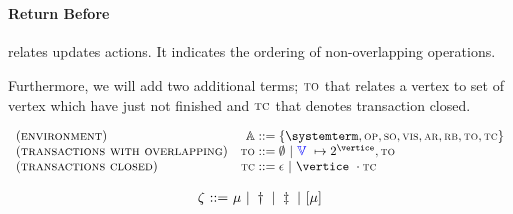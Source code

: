\[\begin{array}{l}
%
%
% 
%

 

 \end{array}
 \]
 


\paragraph{Return Before} relates updates actions. It indicates the ordering of non-overlapping operations. 

Furthermore, we will add two additional terms; $\textsc{\scriptsize{TO}}$ that relates a vertex to set of vertex which have just not finished and $\textsc{\scriptsize{TC}}$ that denotes transaction closed.


\[
    \begin{array}{l@{\quad}r@{\;::=\;}l}
			 (\textsc{environment}) & \environmentterm &  \environmenttran{\systemterm}{\op}{\so}{\vis}{\arb}{\rb}{\tx}{\tc} \\
			 (\textsc{transactions with overlapping}) & \tx &  \emptyset  \ | \ \verticesets\ \mapsto 2^{\vertice},\tx   \\
			 (\textsc{transactions closed}) & \tc &  \epsilon  \ | \ \vertice\ \cdot \tc 
	   \end{array}
\]

\[ 
\begin{array}{r@{\ ::= \ }l}
  \zeta & \mu \ | \ \startsynctran \ | \ \finishsynctran  \ | \  [\mu] \\
\end{array}
\]






